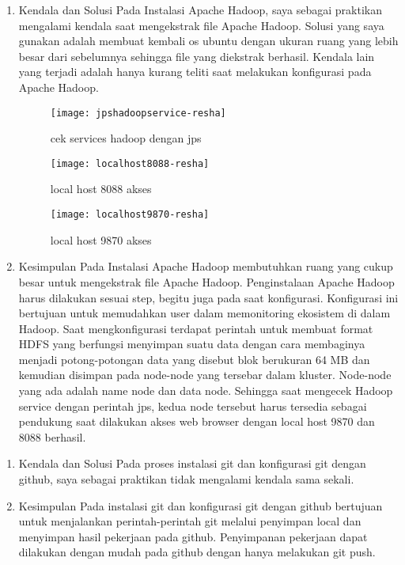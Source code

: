 
\begin{enumerate}
\item Kendala dan Solusi
Pada Instalasi Apache Hadoop, saya sebagai praktikan mengalami kendala saat mengekstrak file Apache Hadoop. Solusi yang saya gunakan adalah membuat kembali os ubuntu dengan ukuran ruang yang lebih besar dari sebelumnya sehingga file yang diekstrak berhasil. 
Kendala lain yang terjadi adalah hanya kurang teliti saat melakukan konfigurasi pada Apache Hadoop.

\begin{figure}[!ht]
\texttt{[image: jpshadoopservice-resha]}
\caption{cek services hadoop dengan jps}
\label{gam:perkuliahan-22-09}
\end{figure}

\begin{figure}[!ht]
\texttt{[image: localhost8088-resha]}
\caption{local host 8088 akses}
\label{gam:perkuliahan-22-09}
\end{figure}

\begin{figure}[!ht]
\texttt{[image: localhost9870-resha]}
\caption{local host 9870 akses}
\label{gam:perkuliahan-22-09}
\end{figure}

\item Kesimpulan
Pada Instalasi Apache Hadoop membutuhkan ruang yang cukup besar untuk mengekstrak file Apache Hadoop. Penginstalaan Apache Hadoop harus dilakukan sesuai step, begitu juga pada saat konfigurasi. Konfigurasi ini bertujuan untuk memudahkan user dalam memonitoring ekosistem di dalam Hadoop. Saat mengkonfigurasi terdapat perintah untuk membuat format HDFS yang berfungsi menyimpan suatu data dengan cara membaginya menjadi potong-potongan data yang disebut blok berukuran 64 MB dan kemudian disimpan pada node-node yang tersebar dalam kluster. Node-node yang ada adalah name node dan data node. Sehingga saat mengecek Hadoop service dengan perintah jps, kedua node tersebut harus tersedia sebagai pendukung saat dilakukan akses web browser dengan local host 9870 dan 8088 berhasil.

\end{enumerate}

\begin{enumerate}
\item Kendala dan Solusi
Pada proses instalasi git dan konfigurasi git dengan github, saya sebagai praktikan tidak mengalami kendala sama sekali.

\item Kesimpulan
Pada instalasi git dan konfigurasi git dengan github bertujuan untuk menjalankan perintah-perintah git melalui penyimpan local dan menyimpan hasil pekerjaan pada github. Penyimpanan pekerjaan dapat dilakukan dengan mudah pada github dengan hanya melakukan git push.

\end{enumerate}

